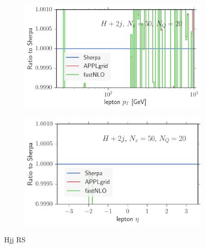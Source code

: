 \begin{figure}
\begin{subfigure}[]{0.49\textwidth}
	\includegraphics[width=\textwidth]{images/hjjrs_lpt.pdf}
\end{subfigure}
\begin{subfigure}[]{0.49\textwidth}
	\includegraphics[width=\textwidth]{images/hjjrs_leta.pdf}
\end{subfigure}
\caption{Hjj RS}
\end{figure}
%
